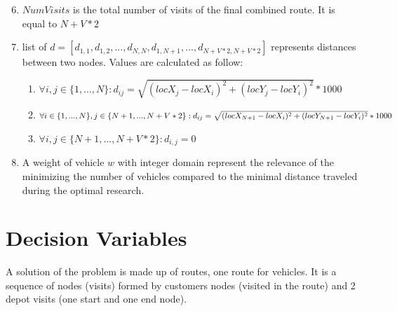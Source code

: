 \begin{enumerate}
 \setcounter{enumi}{5}
    \item \begin{math}NumVisits\end{math} is the total number of visits of the final combined route. It is equal to \begin{math}N + V * 2\end{math}
    \item list of \begin{math}d= [d_{1,1},d_{1,2},..., d_{N,N}, d_{1,N+1},...,d_{N+V*2,N+V*2}] \end{math} represents distances between two nodes. Values are calculated as follow:\newline
    \begin{enumerate}
        \item\begin{math}\forall i,j \in \{1,...,N\}: d_{ij} = \sqrt{(locX_{j} - locX_{i})^2 + (locY_{j} - locY_{i})^2} * 1000\end{math}
        \item\begin{math}\forall i \in \{1,...,N\}, j \in \{N + 1,...,  N + V * 2\}:\newline d_{ij} = \sqrt{(locX_{N+1} - locX_{i})^2 + (locY_{N+1} - locY_{i})^2} * 1000\end{math}
        \item \begin{math}\forall i,j \in \{N + 1,...,  N + V * 2\}: d_{i,j} = 0\end{math}
    \end{enumerate}
    \item A weight of vehicle \begin{math}w\end{math} with integer domain represent the relevance of the minimizing the number of vehicles compared to the minimal distance traveled during the optimal research. 
\end{enumerate}
\section{Decision Variables}
A solution of the problem is made up of routes, one route for vehicles. It is a sequence of nodes (visits) formed by customers nodes (visited in the route) and 2 depot visits (one start and one end node).

